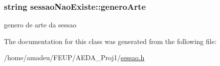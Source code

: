 \subsubsection[{\texorpdfstring{genero\+Arte}{generoArte}}]{\setlength{\rightskip}{0pt plus 5cm}string sessao\+Nao\+Existe\+::genero\+Arte}\hypertarget{classsessaoNaoExiste_a9f8ff344f3b530037e6f35ba6103b29a}{}\label{classsessaoNaoExiste_a9f8ff344f3b530037e6f35ba6103b29a}


genero de arte da sessao 



The documentation for this class was generated from the following file\+:\begin{DoxyCompactItemize}
\item 
/home/amadeu/\+F\+E\+U\+P/\+A\+E\+D\+A\+\_\+\+Proj1/\hyperlink{sessao_8h}{sessao.\+h}\end{DoxyCompactItemize}
